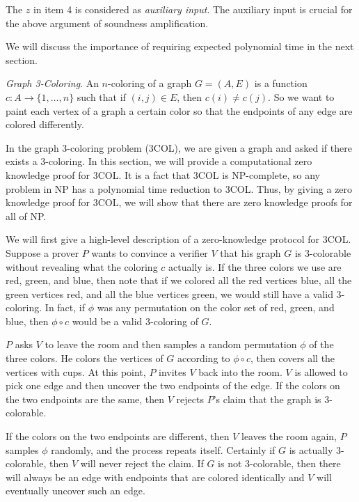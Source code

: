 The $z$ in item 4 is considered as \emph{auxiliary input}. The auxiliary input is crucial for the above argument of soundness amplification.

We will discuss the importance of requiring expected polynomial time in the next section. \bigskip



\noindent \textit{Graph 3-Coloring}. An $n$-coloring of a graph $G = (A, E)$ is a function $c: A \to \{1, \ldots, n \}$ such that if $(i, j) \in E$, then $c(i) \neq c(j)$. So we want to paint each vertex of a graph a certain color so that the endpoints of any edge are colored differently.

In the graph 3-coloring problem (3COL), we are given a graph and asked if there exists a 3-coloring. In this section, we will provide a computational zero knowledge proof for 3COL. It is a fact that 3COL is NP-complete, so any problem in NP has a polynomial time reduction to 3COL. Thus, by giving a zero knowledge proof for 3COL, we will show that there are zero knowledge proofs for all of NP.

We will first give a high-level description of a zero-knowledge protocol for 3COL. Suppose a prover $P$ wants to convince a verifier $V$ that his graph $G$ is 3-colorable without revealing what the coloring $c$ actually is. If the three colors we use are red, green, and blue, then note that if we colored all the red vertices blue, all the green vertices red, and all the blue vertices green, we would still have a valid 3-coloring. In fact, if $\phi$ was any permutation on the color set of red, green, and blue, then $\phi \circ c$ would be a valid 3-coloring of $G$.

$P$ asks $V$ to leave the room and then samples a random permutation $\phi$ of the three colors. He colors the vertices of $G$ according to $\phi \circ c$, then covers all the vertices with cups. At this point, $P$ invites $V$ back into the room. $V$ is allowed to pick one edge and then uncover the two endpoints of the edge. If the colors on the two endpoints are the same, then $V$ rejects $P$'s claim that the graph is 3-colorable.

If the colors on the two endpoints are different, then $V$ leaves the room again, $P$ samples $\phi$ randomly, and the process repeats itself. Certainly if $G$ is actually 3-colorable, then $V$ will never reject the claim. If $G$ is not 3-colorable, then there will always be an edge with endpoints that are colored identically and $V$ will eventually uncover such an edge.

